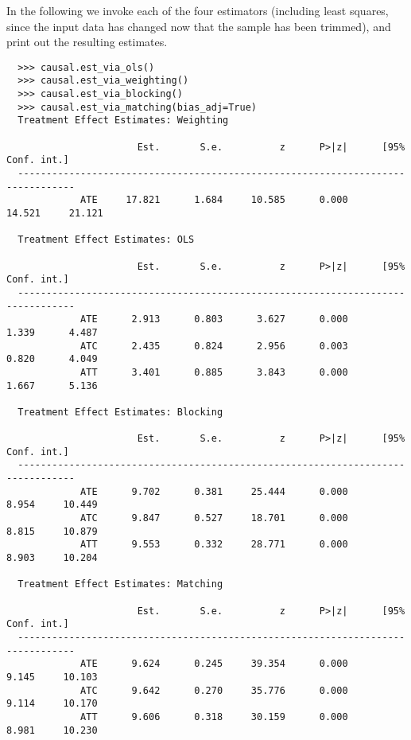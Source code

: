\documentclass[12pt]{article}
\theoremstyle{definition}
\theoremstyle{definition}
\theoremstyle{definition}
\theoremstyle{remark}
\begin{document}
In the following we invoke each of the four estimators (including least squares, since the input data has changed now that the sample has been trimmed), and print out the resulting estimates.
\begin{verbatim}
  >>> causal.est_via_ols()
  >>> causal.est_via_weighting()
  >>> causal.est_via_blocking()
  >>> causal.est_via_matching(bias_adj=True)
  Treatment Effect Estimates: Weighting
  
                       Est.       S.e.          z      P>|z|      [95% Conf. int.]
  --------------------------------------------------------------------------------
             ATE     17.821      1.684     10.585      0.000     14.521     21.121
  
  Treatment Effect Estimates: OLS
  
                       Est.       S.e.          z      P>|z|      [95% Conf. int.]
  --------------------------------------------------------------------------------
             ATE      2.913      0.803      3.627      0.000      1.339      4.487
             ATC      2.435      0.824      2.956      0.003      0.820      4.049
             ATT      3.401      0.885      3.843      0.000      1.667      5.136
  
  Treatment Effect Estimates: Blocking
  
                       Est.       S.e.          z      P>|z|      [95% Conf. int.]
  --------------------------------------------------------------------------------
             ATE      9.702      0.381     25.444      0.000      8.954     10.449
             ATC      9.847      0.527     18.701      0.000      8.815     10.879
             ATT      9.553      0.332     28.771      0.000      8.903     10.204
  
  Treatment Effect Estimates: Matching
  
                       Est.       S.e.          z      P>|z|      [95% Conf. int.]
  --------------------------------------------------------------------------------
             ATE      9.624      0.245     39.354      0.000      9.145     10.103
             ATC      9.642      0.270     35.776      0.000      9.114     10.170
             ATT      9.606      0.318     30.159      0.000      8.981     10.230
\end{verbatim}
\end{document}
